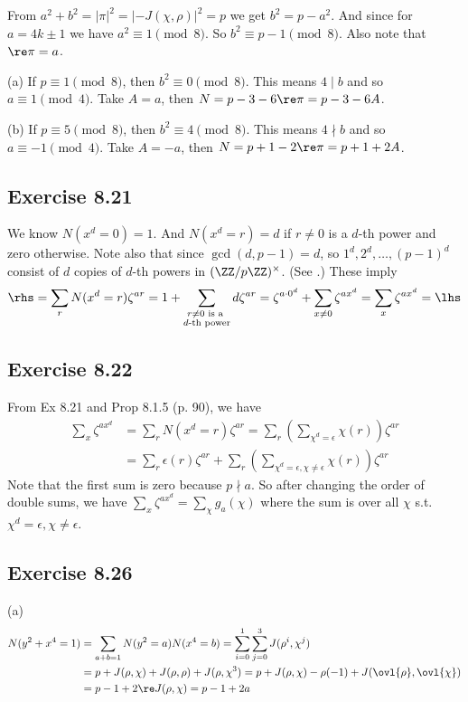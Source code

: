 \documentclass[../Chapter.tex]{subfiles}
\begin{document}
From $a^2+b^2=|\pi|^2=|-J(\chi,\rho)|^2=p$ we get $b^2=p-a^2$. And since for $a=4k\pm1$ we have $a^2\equiv1\pmod{8}$. So $b^2\equiv p-1\pmod{8}$. Also note that $\re\pi=a$.

(a) If $p\equiv1\pmod{8}$, then $b^2\equiv0\pmod{8}$. This means $4\mid b$ and so $a\equiv 1\pmod{4}$. Take $A=a$, then $N=p-3-6\re\pi=p-3-6A$.

(b) If $p\equiv5\pmod{8}$, then $b^2\equiv4\pmod{8}$. This means $4\nmid b$ and so $a\equiv-1\pmod{4}$. Take $A=-a$, then $N=p+1-2\re\pi=p+1+2A$.

\subsection*{Exercise 8.21}

We know $N(x^d=0)=1$. And $N(x^d=r)=d$ if $r\neq0$ is a $d$-th power and zero otherwise. Note also that since $\gcd(d,p-1)=d$, so $1^d,2^d,\ldots,(p-1)^d$ consist of $d$ copies of $d$-th powers in $(\ZZ/p\ZZ)^\times$. (See .) These imply $$\rhs=\sum_r N(x^d=r)\zeta^{ar} = 1+\sum_{\substack{r\neq0 \text{ is a } \\ d\text{-th power}}} d\zeta^{ar} = \zeta^{a\cdot0^d} + \sum_{x\neq0} \zeta^{ax^d} = \sum_x \zeta^{ax^d} = \lhs$$

\subsection*{Exercise 8.22}

From Ex 8.21 and Prop 8.1.5 (p. 90), we have
\begin{align*}
\sum_x \zeta^{ax^d} &= \sum_r N(x^d=r)\zeta^{ar} = \sum_r \left(\sum_{\chi^d=\epsilon} \chi(r)\right)\zeta^{ar} \\
&= \sum_r \epsilon(r)\zeta^{ar} + \sum_r\left(\sum_{\chi^d=\epsilon,\chi\neq\epsilon} \chi(r)\right)\zeta^{ar}
\end{align*}
Note that the first sum is zero because $p\nmid a$. So after changing the order of double sums, we have $\sum_x \zeta^{ax^d} = \sum_\chi g_a(\chi)$ where the sum is over all $\chi$ s.t. $\chi^d=\epsilon,\chi\neq\epsilon$.

\subsection*{Exercise 8.26}

(a) \begin{align*}
N(y^2+x^4=1) &= \sum_{a+b=1} N(y^2=a)N(x^4=b) = \sum_{i=0}^1\sum_{j=0}^3 J(\rho^i,\chi^j) \\
&= p+J(\rho,\chi)+J(\rho,\rho)+J(\rho,\chi^3) = p+J(\rho,\chi)-\rho(-1)+J(\ovl{\rho},\ovl{\chi}) \\
&= p-1+2\re J(\rho,\chi) = p-1+2a
\end{align*}
\end{document}
